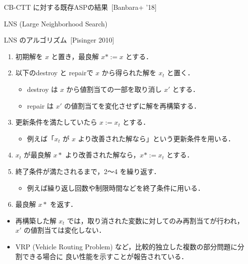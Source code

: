 \documentclass[11pt,dvipdfmx]{beamer}
\begin{document}
\begin{frame}{CB-CTT に対する既存ASPの結果~[Banbara+ '18]}
  \centering
  \scriptsize
  \begin{tableC}
    
  \end{tableC}
\end{frame}
\begin{frame}{LNS (Large Neighborhood Search)}
  \begin{block}{LNS のアルゴリズム~[Pisinger 2010]}
    \begin{enumerate}
      \compress
      \item 初期解を $x$ と置き，最良解 $x* := x$ とする．
      \item 以下のdestroy と repairで $x$ から得られた解を $x_t$ と置く．
      \begin{itemize}
        \compress
      \item destroy は $x$ から値割当ての一部を取り消し $x'$ とする．
      \item repair は $x'$ の\alert{値割当てを変化させずに解を再構築}する．
      \end{itemize}
      \item 更新条件を満たしていたら $x := x_t$ とする．
      \begin{itemize}
        \item 例えば「$x_t$ が $x$ より改善された解なら」という更新条件を用いる．
      \end{itemize}
      \item $x_t$ が最良解 $x*$ より改善された解なら，$x* := x_t$ とする．
      \item 終了条件が満たされるまで，2〜4 を繰り返す．
      \begin{itemize}
        \item 例えば繰り返し回数や制限時間などを終了条件に用いる．
      \end{itemize}
      \item 最良解 $x*$ を返す．
    \end{enumerate}
  \end{block}
  \begin{itemize}
    \item 再構築した解 $x_t$ では，取り消された変数に対してのみ再割当てが行われ，$x'$ の値割当ては変化しない．
    \item VRP (Vehicle Routing Problem) など，比較的独立した複数の部分問題に分割できる場合に
          良い性能を示すことが報告されている．
  \end{itemize}
\end{frame}
\end{document}
